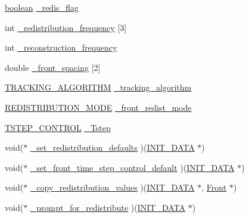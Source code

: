\begin{DoxyCompactItemize}
\item 
\hyperlink{cdecs_8h_ad048433382a936258fb49e2ec4f148e1}{boolean} \hyperlink{struct___f___i_n_i_t___d_a_t_a_a1c6d4f523dc0def9ea6137010ba7fb67}{\+\_\+redis\+\_\+flag}
\item 
int \hyperlink{struct___f___i_n_i_t___d_a_t_a_abd160c7fdff6d0e408b55a0355bc7ba3}{\+\_\+redistribution\+\_\+frequency} \mbox{[}3\mbox{]}
\item 
int \hyperlink{struct___f___i_n_i_t___d_a_t_a_af2f530f111c9f9588322c34b5eb4bf00}{\+\_\+reconstruction\+\_\+frequency}
\item 
double \hyperlink{struct___f___i_n_i_t___d_a_t_a_acf84f9e3e784086f7b803c8987deeb98}{\+\_\+front\+\_\+spacing} \mbox{[}2\mbox{]}
\item 
\hyperlink{fdecs_8h_a762a533b4685c7569a723fde13372950}{T\+R\+A\+C\+K\+I\+N\+G\+\_\+\+A\+L\+G\+O\+R\+I\+T\+HM} \hyperlink{struct___f___i_n_i_t___d_a_t_a_a2a8f9347fccd0e4e62260edcdbaf9f53}{\+\_\+tracking\+\_\+algorithm}
\item 
\hyperlink{fdecs_8h_a01f67da2a9919f737c24b70c7932c0f1}{R\+E\+D\+I\+S\+T\+R\+I\+B\+U\+T\+I\+O\+N\+\_\+\+M\+O\+DE} \hyperlink{struct___f___i_n_i_t___d_a_t_a_ab6643f4c14d1a3e80ff78244e96803bb}{\+\_\+front\+\_\+redist\+\_\+mode}
\item 
\hyperlink{fdecs_8h_a99d2e7ba3057dd9fae95a64ce8c09c28}{T\+S\+T\+E\+P\+\_\+\+C\+O\+N\+T\+R\+OL} \hyperlink{struct___f___i_n_i_t___d_a_t_a_af800d93cc6081dd6264eb9ff247d5878}{\+\_\+\+Tstep}
\item 
void($\ast$ \hyperlink{struct___f___i_n_i_t___d_a_t_a_a9e0de23907a97ea44632a777d44d2ef4}{\+\_\+set\+\_\+redistribution\+\_\+defaults} )(\hyperlink{cdecs_8h_a18423d263765f9b6e78d8f1089446c91}{I\+N\+I\+T\+\_\+\+D\+A\+TA} $\ast$)
\item 
void($\ast$ \hyperlink{struct___f___i_n_i_t___d_a_t_a_aeb83727a7e47d853d1d323cbfce2a23b}{\+\_\+set\+\_\+front\+\_\+time\+\_\+step\+\_\+control\+\_\+default} )(\hyperlink{cdecs_8h_a18423d263765f9b6e78d8f1089446c91}{I\+N\+I\+T\+\_\+\+D\+A\+TA} $\ast$)
\item 
void($\ast$ \hyperlink{struct___f___i_n_i_t___d_a_t_a_a99898ccb0b4473253679b4212d628a86}{\+\_\+copy\+\_\+redistribution\+\_\+values} )(\hyperlink{cdecs_8h_a18423d263765f9b6e78d8f1089446c91}{I\+N\+I\+T\+\_\+\+D\+A\+TA} $\ast$, \hyperlink{fdecs_8h_ac32202b798f848095c489cfd04c4ca5f}{Front} $\ast$)
\item 
void($\ast$ \hyperlink{struct___f___i_n_i_t___d_a_t_a_ab921be61efa72c3284928a40c17478fa}{\+\_\+prompt\+\_\+for\+\_\+redistribute} )(\hyperlink{cdecs_8h_a18423d263765f9b6e78d8f1089446c91}{I\+N\+I\+T\+\_\+\+D\+A\+TA} $\ast$)

\end{DoxyCompactItemize}
